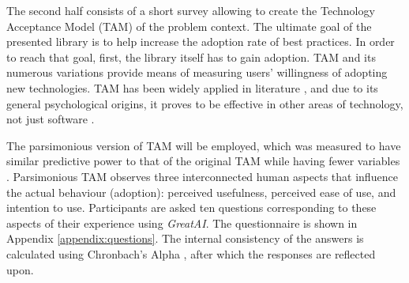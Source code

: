 The second half consists of a short survey allowing to create the Technology Acceptance Model (TAM) \cite{davis1989perceived} of the problem context. The ultimate goal of the presented library is to help increase the adoption rate of best practices. In order to reach that goal, first, the library itself has to gain adoption. TAM and its numerous variations provide means of measuring users' willingness of adopting new technologies. TAM has been widely applied in literature \cite{marangunic2015technology}, and due to its general psychological origins, it proves to be effective in other areas of technology, not just software \cite{riemenschneider2002explaining}. 

The parsimonious version of TAM will be employed, which was measured to have similar predictive power to that of the original TAM while having fewer variables \cite{wu2011user}. Parsimonious TAM observes three interconnected human aspects that influence the actual behaviour (adoption): perceived usefulness, perceived ease of use, and intention to use. Participants are asked ten questions corresponding to these aspects of their experience using \textit{GreatAI}. The questionnaire is shown in Appendix \ref{appendix:questions}. The internal consistency of the answers is calculated using Chronbach's Alpha \cite{bland1997statistics}, after which the responses are reflected upon.
